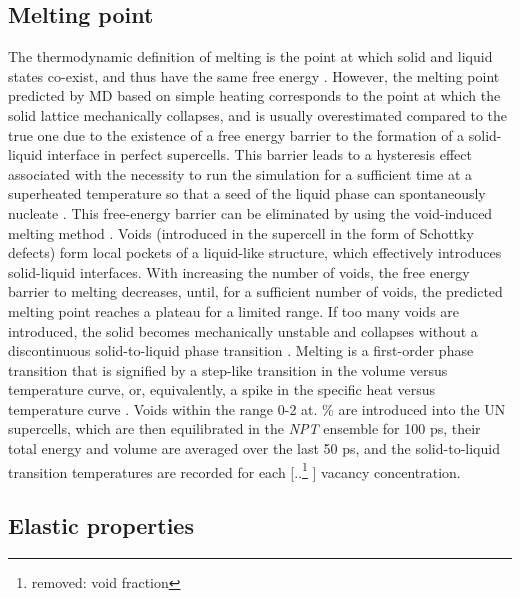 \documentclass[preprint, 12pt]{elsarticle}
\providecommand{\DIFaddtex}[1]{{\protect\color{blue} \sf #1}} %
\providecommand{\DIFdeltex}[1]{{\protect\color{red} [..\footnote{removed: #1} ]}} %
\providecommand{\DIFaddbegin}{} %
\providecommand{\DIFaddend}{} %
\providecommand{\DIFdelbegin}{} %
\providecommand{\DIFdelend}{} %
\providecommand{\DIFadd}[1]{\texorpdfstring{\DIFaddtex{#1}}{#1}} %
\providecommand{\DIFdel}[1]{\texorpdfstring{\DIFdeltex{#1}}{}} %
\newcommand{\DIFscaledelfig}{0.5}
\newlength{\DIFdelgraphicswidth} %
\newlength{\DIFdelgraphicsheight} %
\newcommand{\DIFaddincludegraphics}[2][]{{\color{blue}\fbox{\DIFOincludegraphics[#1]{#2}}}} %
\newcommand{\DIFdelincludegraphics}[2][]{%
\sbox{\DIFdelgraphicsbox}{\DIFOincludegraphics[#1]{#2}}%
\settoboxwidth{\DIFdelgraphicswidth}{\DIFdelgraphicsbox} %
\settoboxtotalheight{\DIFdelgraphicsheight}{\DIFdelgraphicsbox} %
\scalebox{\DIFscaledelfig}{%
\parbox[b]{\DIFdelgraphicswidth}{\usebox{\DIFdelgraphicsbox}\\[-\baselineskip] \rule{\DIFdelgraphicswidth}{0em}}\llap{\resizebox{\DIFdelgraphicswidth}{\DIFdelgraphicsheight}{%
\setlength{\unitlength}{\DIFdelgraphicswidth}%
\begin{picture}(1,1)%
\thicklines\linethickness{2pt} %
{\color[rgb]{1,0,0}\put(0,0){\framebox(1,1){}}}%
{\color[rgb]{1,0,0}\put(0,0){\line( 1,1){1}}}%
{\color[rgb]{1,0,0}\put(0,1){\line(1,-1){1}}}%
\end{picture}%
}\hspace*{3pt}}} %
} %
\DeclareRobustCommand{\DIFaddbegin}{\DIFOaddbegin \let\includegraphics\DIFaddincludegraphics} %
\DeclareRobustCommand{\DIFaddend}{\DIFOaddend \let\includegraphics\DIFOincludegraphics} %
\DeclareRobustCommand{\DIFdelbegin}{\DIFOdelbegin \let\includegraphics\DIFdelincludegraphics} %
\DeclareRobustCommand{\DIFdelend}{\DIFOaddend \let\includegraphics\DIFOincludegraphics} %
\begin{document}
\subsection{Melting point}

The thermodynamic definition of melting is the point at which solid and liquid states co-exist, and thus have the same free energy \cite{Alavi2006, Zhang2012}. However, the melting point predicted by MD based on simple heating corresponds to the point at which the solid lattice mechanically collapses, and is usually overestimated compared to the true one due to the existence of a free energy barrier to the formation of a solid-liquid interface in perfect supercells. This barrier leads to a hysteresis effect associated with the necessity to run the simulation for a sufficient time at a superheated temperature so that a seed of the liquid phase can spontaneously nucleate \cite{Ercolessi1997, Alavi2006}. This free-energy barrier can be eliminated by using the void-induced melting method \cite{Alavi2006, Zhang2012}. Voids (introduced in the supercell in the form of Schottky defects) form local pockets of a liquid-like structure, which effectively introduces solid-liquid interfaces. With increasing the number of voids, the free energy barrier to melting decreases, until, for a sufficient number of voids, the predicted melting point reaches a plateau for a limited range. If too many voids are introduced, the solid becomes mechanically unstable and collapses without a discontinuous solid-to-liquid phase transition \cite{Alavi2006}. Melting is a first-order phase transition that is signified by a step-like transition in the volume versus temperature curve, or, equivalently, a spike in the specific heat versus temperature curve \cite{Blundell2010}. Voids within the range 0-2 at. \% are introduced into the UN supercells, which are then equilibrated in the \textit{NPT} ensemble for 100 ps, their total energy and volume are averaged over the last 50 ps, and the solid-to-liquid transition temperatures are recorded for each \DIFdelbegin \DIFdel{void fraction}\DIFdelend \DIFaddbegin \DIFadd{vacancy concentration}\DIFaddend . 

\subsection{Elastic properties}
\end{document}
